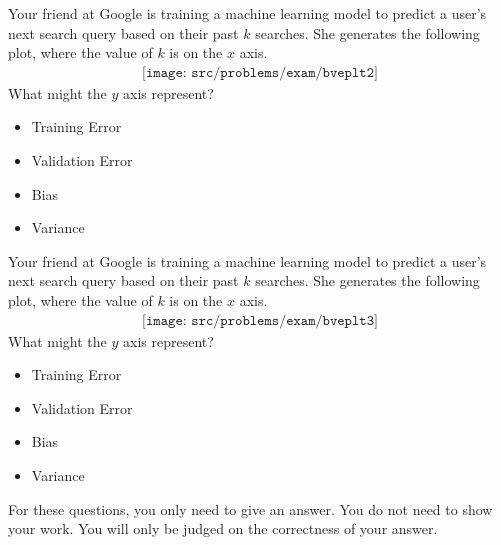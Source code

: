 \begin{Parts}
\ifexamnosol
\vspace{2in}
\fi
\Part Your friend at Google is training a machine learning model to predict a user's next search query based on their past $k$ searches. She generates the following plot, where the value of $k$ is on the $x$ axis.
\begin{align*}
\texttt{[image: src/problems/exam/bveplt2]}
\end{align*}
What might the $y$ axis represent?
\begin{multicols}{2}
	\begin{itemize}[label= ,itemsep=10pt, topsep=10pt, leftmargin=0pt]
		\item \mcqb Training Error
		\item \mcqb Validation Error
		\item \mcqb Bias
		\item \mcqb Variance
	\end{itemize}
\end{multicols}

\Part Your friend at Google is training a machine learning model to predict a user's next search query based on their past $k$ searches. She generates the following plot, where the value of $k$ is on the $x$ axis.
\begin{align*}
\texttt{[image: src/problems/exam/bveplt3]}
\end{align*}
What might the $y$ axis represent?
\begin{multicols}{2}
	\begin{itemize}[label= ,itemsep=10pt, topsep=10pt, leftmargin=0pt]
		\item \mcqb Training Error
		\item \mcqb Validation Error
		\item \mcqb Bias
		\item \mcqb Variance
	\end{itemize}
\end{multicols}

\end{Parts}


For these questions, you only need to give an answer. 
You do not need to show your work. 
You will only be judged on the correctness of your answer.

